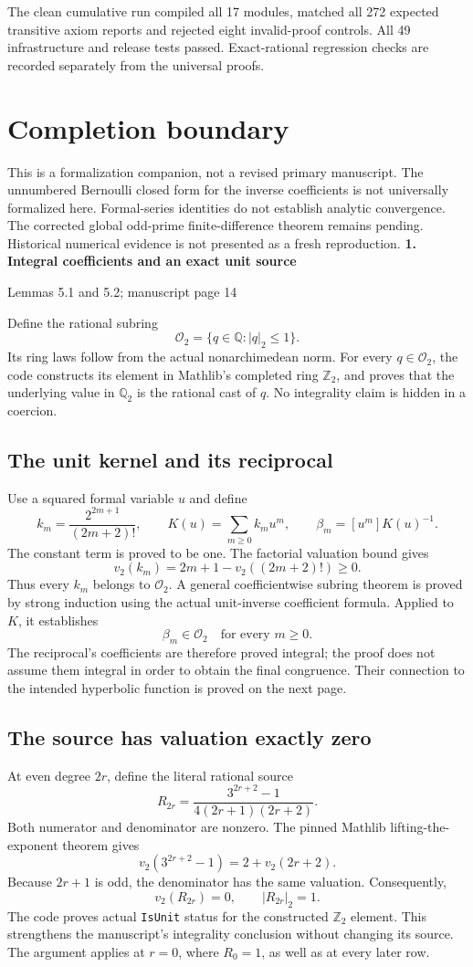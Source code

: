 \documentclass[11pt]{article}
\newcommand{\Q}{\mathbb Q}\newcommand{\Z}{\mathbb Z}\newcommand{\N}{\mathbb N}
\newcommand{\pageheading}[2]{{\Large\bfseries\color{ink}#1}\par{\small #2}\par\medskip}
\begin{document}
The clean cumulative run compiled all 17 modules, matched all 272 expected transitive axiom reports and rejected eight invalid-proof controls. All 49 infrastructure and release tests passed. Exact-rational regression checks are recorded separately from the universal proofs.

\section*{Completion boundary}
This is a formalization companion, not a revised primary manuscript. The unnumbered Bernoulli closed form for the inverse coefficients is not universally formalized here. Formal-series identities do not establish analytic convergence. The corrected global odd-prime finite-difference theorem remains pending. Historical numerical evidence is not presented as a fresh reproduction.
\newpage
\pageheading{1. Integral coefficients and an exact unit source}{Lemmas 5.1 and 5.2; manuscript page 14}
Define the rational subring
\[
 \mathcal O_2=\{q\in\Q:|q|_2\leq1\}.
\]
Its ring laws follow from the actual nonarchimedean norm. For every $q\in\mathcal O_2$, the code constructs its element in Mathlib's completed ring $\Z_2$, and proves that the underlying value in $\Q_2$ is the rational cast of $q$. No integrality claim is hidden in a coercion.

\subsection*{The unit kernel and its reciprocal}
Use a squared formal variable $u$ and define
\[
 k_m=\frac{2^{2m+1}}{(2m+2)!},\qquad
 K(u)=\sum_{m\geq0}k_mu^m,\qquad
 \beta_m=[u^m]K(u)^{-1}.
\]
The constant term is proved to be one. The factorial valuation bound gives
\[
 v_2(k_m)=2m+1-v_2((2m+2)!)\geq0.
\]
Thus every $k_m$ belongs to $\mathcal O_2$. A general coefficientwise subring theorem is proved by strong induction using the actual unit-inverse coefficient formula. Applied to $K$, it establishes
\[
 \boxed{\beta_m\in\mathcal O_2\quad\text{for every }m\geq0.}
\]
The reciprocal's coefficients are therefore proved integral; the proof does not assume them integral in order to obtain the final congruence. Their connection to the intended hyperbolic function is proved on the next page.

\subsection*{The source has valuation exactly zero}
At even degree $2r$, define the literal rational source
\[
 R_{2r}=\frac{3^{2r+2}-1}{4(2r+1)(2r+2)}.
\]
Both numerator and denominator are nonzero. The pinned Mathlib lifting-the-exponent theorem gives
\[
 v_2(3^{2r+2}-1)=2+v_2(2r+2).
\]
Because $2r+1$ is odd, the denominator has the same valuation. Consequently,
\[
 \boxed{v_2(R_{2r})=0,\qquad |R_{2r}|_2=1.}
\]
The code proves actual \texttt{IsUnit} status for the constructed $\Z_2$ element. This strengthens the manuscript's integrality conclusion without changing its source. The argument applies at $r=0$, where $R_0=1$, as well as at every later row.
\end{document}
